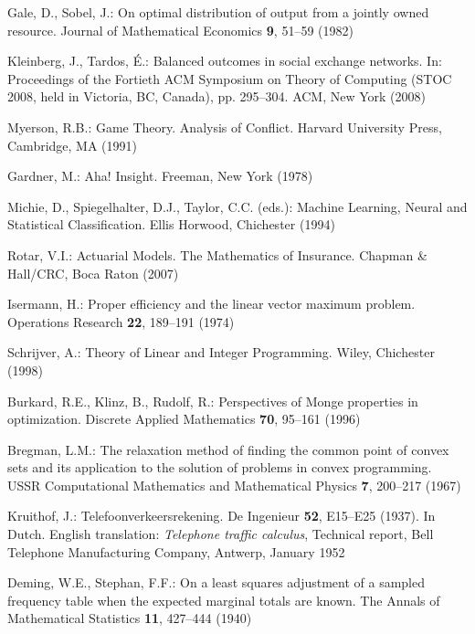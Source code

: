 \documentclass{article}
\theoremstyle{definition}
\begin{document}
\begin{thebibliography}{10}
Gale, D., Sobel, J.: On optimal distribution of output from a jointly owned
  resource.
\newblock Journal of Mathematical Economics \textbf{9}, 51--59 (1982)

Kleinberg, J., Tardos, {\'E}.: Balanced outcomes in social exchange networks.
\newblock In: Proceedings of the Fortieth ACM Symposium on Theory of Computing
  \rm (STOC 2008, held in Victoria, BC, Canada), pp. 295--304. ACM, New York
  (2008)

Myerson, R.B.: Game Theory. Analysis of Conflict.
\newblock Harvard University Press, Cambridge, MA (1991)

Gardner, M.: Aha! Insight.
\newblock Freeman, New York (1978)

Michie, D., Spiegelhalter, D.J., Taylor, C.C. (eds.): Machine Learning, Neural
  and Statistical Classification.
\newblock Ellis Horwood, Chichester (1994)

Rotar, V.I.: Actuarial Models. The Mathematics of Insurance.
\newblock Chapman \& Hall/CRC, Boca Raton (2007)

Isermann, H.: Proper efficiency and the linear vector maximum problem.
\newblock Operations Research \textbf{22}, 189--191 (1974)

Schrijver, A.: Theory of Linear and Integer Programming.
\newblock Wiley, Chichester (1998)

Burkard, R.E., Klinz, B., Rudolf, R.: Perspectives of {Monge} properties in
  optimization.
\newblock Discrete Applied Mathematics \textbf{70}, 95--161 (1996)

Bregman, L.M.: The relaxation method of finding the common point of convex sets
  and its application to the solution of problems in convex programming.
\newblock USSR Computational Mathematics and Mathematical Physics \textbf{7},
  200--217 (1967)

Kruithof, J.: Telefoonverkeersrekening.
\newblock De Ingenieur \textbf{52}, E15--E25 (1937).
\newblock In Dutch. English translation: \emph{Telephone traffic calculus},
  Technical report, Bell Telephone Manufacturing Company, Antwerp, January 1952

Deming, W.E., Stephan, F.F.: On a least squares adjustment of a sampled
  frequency table when the expected marginal totals are known.
\newblock The Annals of Mathematical Statistics \textbf{11}, 427--444 (1940)


\end{thebibliography}
\end{document}
